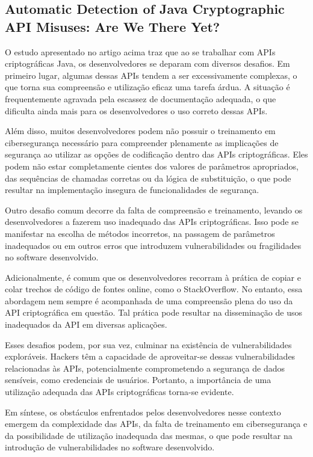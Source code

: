 \subsection{Automatic Detection of Java Cryptographic API Misuses: Are We There Yet?}

O estudo apresentado no artigo acima traz que ao se trabalhar com APIs criptográficas Java, os desenvolvedores se deparam com diversos desafios. Em primeiro lugar, algumas dessas APIs tendem a ser excessivamente complexas, o que torna sua compreensão e utilização eficaz uma tarefa árdua. A situação é frequentemente agravada pela escassez de documentação adequada, o que dificulta ainda mais para os desenvolvedores o uso correto dessas APIs.

Além disso, muitos desenvolvedores podem não possuir o treinamento em cibersegurança necessário para compreender plenamente as implicações de segurança ao utilizar as opções de codificação dentro das APIs criptográficas. Eles podem não estar completamente cientes dos valores de parâmetros apropriados, das sequências de chamadas corretas ou da lógica de substituição, o que pode resultar na implementação insegura de funcionalidades de segurança.

Outro desafio comum decorre da falta de compreensão e treinamento, levando os desenvolvedores a fazerem uso inadequado das APIs criptográficas. Isso pode se manifestar na escolha de métodos incorretos, na passagem de parâmetros inadequados ou em outros erros que introduzem vulnerabilidades ou fragilidades no software desenvolvido.

Adicionalmente, é comum que os desenvolvedores recorram à prática de copiar e colar trechos de código de fontes online, como o StackOverflow. No entanto, essa abordagem nem sempre é acompanhada de uma compreensão plena do uso da API criptográfica em questão. Tal prática pode resultar na disseminação de usos inadequados da API em diversas aplicações.

Esses desafios podem, por sua vez, culminar na existência de vulnerabilidades exploráveis. Hackers têm a capacidade de aproveitar-se dessas vulnerabilidades relacionadas às APIs, potencialmente comprometendo a segurança de dados sensíveis, como credenciais de usuários. Portanto, a importância de uma utilização adequada das APIs criptográficas torna-se evidente.

Em síntese, os obstáculos enfrentados pelos desenvolvedores nesse contexto emergem da complexidade das APIs, da falta de treinamento em cibersegurança e da possibilidade de utilização inadequada das mesmas, o que pode resultar na introdução de vulnerabilidades no software desenvolvido.

